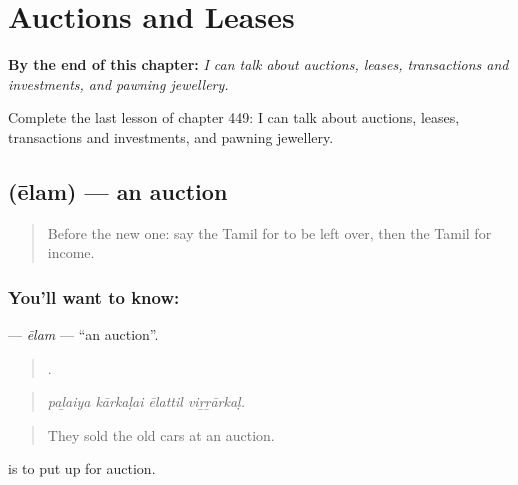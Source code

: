 
\chapter{Auctions and Leases}
\label{ch:ta-auctions-and-leases}

\begin{chapteropening}
\textbf{By the end of this chapter:} \emph{I can talk about auctions, leases, transactions and investments, and pawning jewellery.}

Complete the last lesson of chapter 449: I can talk about auctions, leases, transactions and investments, and pawning jewellery.
\end{chapteropening}

\section[\texorpdfstring{\ta{ஏலம்} (ēlam)}{ஏலம் (ēlam)}]{ (ēlam) — an auction}

\label{lesson:TA-C449-elam}



\begin{quote}
Before the new one: say the Tamil for to be left over, then the Tamil for income.
\end{quote}

\subsection*{You'll want to know: }
\textbf{} — \emph{ēlam} — \textquotedblleft{}an auction\textquotedblright{}.

\begin{quote}
   .
\end{quote}

\begin{quote}
\emph{paḻaiya kārkaḷai ēlattil viṟṟārkaḷ.}
\end{quote}

\begin{quote}
They sold the old cars at an auction.
\end{quote}

  is to put up for auction.

